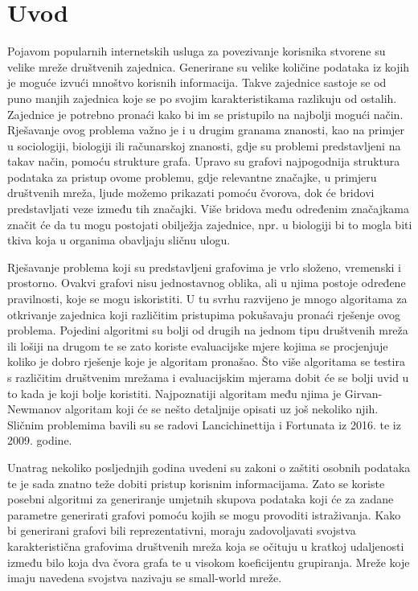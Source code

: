 \chapter{Uvod}

Pojavom popularnih internetskih usluga za povezivanje korisnika stvorene su velike mreže društvenih zajednica. Generirane su velike količine podataka iz kojih je moguće izvući mnoštvo korisnih informacija. Takve zajednice sastoje se od puno manjih zajednica koje se po svojim karakteristikama razlikuju od ostalih. Zajednice je potrebno pronaći kako bi im se pristupilo na najbolji mogući način. Rješavanje ovog problema važno je i u drugim granama znanosti, kao na primjer u sociologiji, biologiji ili računarskoj znanosti, gdje su problemi predstavljeni na takav način, pomoću strukture grafa. Upravo su grafovi najpogodnija struktura podataka za pristup ovome problemu, gdje relevantne značajke, u primjeru društvenih mreža, ljude možemo prikazati pomoću čvorova, dok će bridovi predstavljati veze između tih značajki. Više bridova među određenim značajkama značit će da tu mogu postojati obilježja zajednice, npr. u biologiji bi to mogla biti tkiva koja u organima obavljaju sličnu ulogu. 

Rješavanje problema koji su predstavljeni grafovima je vrlo složeno, vremenski i prostorno. Ovakvi grafovi nisu jednostavnog oblika, ali u njima postoje određene pravilnosti, koje se mogu iskoristiti. U tu svrhu razvijeno je mnogo algoritama za otkrivanje zajednica koji različitim pristupima pokušavaju pronaći rješenje ovog problema. Pojedini algoritmi su bolji od drugih na jednom tipu društvenih mreža ili lošiji na drugom te se zato koriste evaluacijske mjere kojima se procjenjuje koliko je dobro rješenje koje je algoritam pronašao. Što više algoritama se testira s različitim društvenim mrežama i evaluacijskim mjerama dobit će se bolji uvid u to kada je koji bolje koristiti. Najpoznatiji algoritam među njima je Girvan-Newmanov algoritam koji će se nešto detaljnije opisati uz još nekoliko njih. Sličnim problemima bavili su se radovi Lancichinettija i Fortunata \cite{fortunato2016community} iz 2016. te \cite{lancichinetti2009community} iz 2009. godine.

Unatrag nekoliko posljednjih  godina uvedeni su zakoni o zaštiti osobnih podataka te je sada znatno teže dobiti pristup korisnim informacijama. Zato se koriste posebni algoritmi za generiranje umjetnih skupova podataka koji će za zadane parametre generirati grafovi pomoću kojih se mogu provoditi istraživanja. Kako bi generirani grafovi bili reprezentativni, moraju zadovoljavati svojstva karakteristična grafovima društvenih mreža koja se očituju u kratkoj udaljenosti između bilo koja dva čvora grafa te u visokom koeficijentu grupiranja. Mreže koje imaju navedena svojstva nazivaju se small-world mreže.


